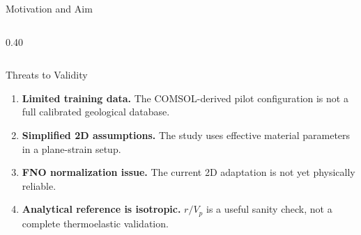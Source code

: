 \documentclass[aspectratio=169,10pt]{beamer}
\begin{document}
\begin{frame}{Motivation and Aim}
\begin{columns}[T]
\begin{column}{0.40\textwidth}

    \end{column}

  \end{columns}
\end{frame}

\begin{frame}{Threats to Validity}
  \begin{enumerate}
    \item \textbf{Limited training data.}
          The COMSOL-derived pilot configuration is not a full calibrated
          geological database.
    \item \textbf{Simplified 2D assumptions.}
          The study uses effective material parameters in a plane-strain setup.
    \item \textbf{FNO normalization issue.}
          The current 2D adaptation is not yet physically reliable.
    \item \textbf{Analytical reference is isotropic.}
          $r/V_p$ is a useful sanity check, not a complete thermoelastic validation.
  \end{enumerate}
\end{frame}
\end{document}

